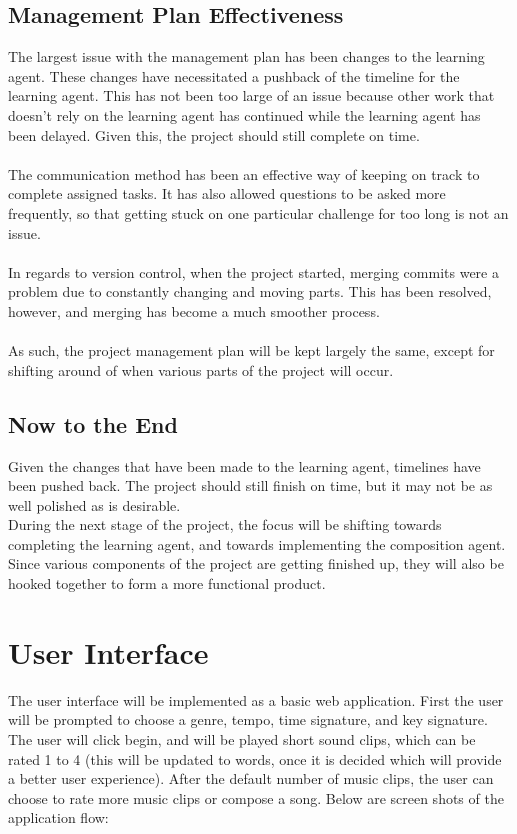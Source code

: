 \documentclass{article}
\begin{document}
\subsection{Management Plan Effectiveness}
The largest issue with the management plan has been changes to the learning agent. These changes have
necessitated a pushback of the timeline for the learning agent. This has not been too large of an issue
because other work that doesn't rely on the learning agent has continued while the learning agent has
been delayed. Given this, the project should still complete on time.\\
\\
The communication method has been an effective way of keeping on track to complete assigned tasks. 
It has also allowed questions to be asked more frequently, so that getting stuck on one particular 
challenge for too long is not an issue.\\
\\
In regards to version control, when the project started, merging commits were a problem due to constantly 
changing and moving parts. This has been resolved, however, and merging has become a much smoother process.\\
\\
As such, the project management plan will be kept largely the same, except for shifting around of when 
various parts of the project will occur.

\subsection{Now to the End}
Given the changes that have been made to the learning agent, timelines have been pushed back. The project
should still finish on time, but it may not be as well polished as is desirable.
\\
During the next stage of the project, the focus will be shifting towards completing the learning agent, and
towards implementing the composition agent. Since various components of the project are getting finished up,
they will also be hooked together to form a more functional product.

\section{User Interface}
The user interface will be implemented as a basic web application. First the user will be prompted 
to choose a genre, tempo, time signature, and key signature.  The user will click begin, and will 
be played short sound clips, which can be rated 1 to 4 (this will be updated to words, once it is 
decided which will provide a better user experience).  After the default number of music clips, the 
user can choose to rate more music clips or compose a song.  
Below are screen shots of the application flow:
\end{document}
